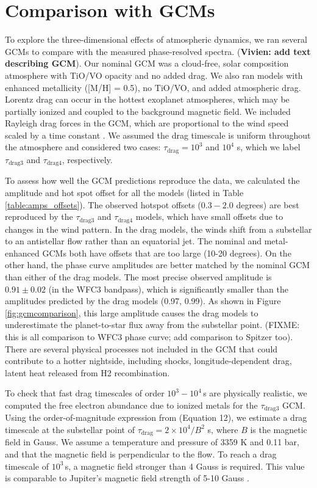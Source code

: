 \documentclass[twocolumn]{aastex61}
\begin{document}
\section{Comparison with GCMs}
\label{sec:gcm}
To explore the three-dimensional effects of atmospheric dynamics, we ran several GCMs to compare with the measured phase-resolved spectra. (\textbf{Vivien: add text describing GCM}).  Our nominal GCM was a cloud-free, solar composition atmosphere with TiO/VO opacity and no added drag.  We also ran models with enhanced metallicity ([M/H] = 0.5), no TiO/VO, and added atmospheric drag.  Lorentz drag can occur in the hottest exoplanet atmospheres, which may be partially ionized and coupled to the background magnetic field. We included Rayleigh drag forces in the GCM, which are proportional to the wind speed scaled by a time constant \citep[$F_\mathrm{drag} \propto -v/\tau_\mathrm{drag}$;][]{menou09}. We assumed the drag timescale is uniform throughout the atmosphere and considered two cases: $\tau_\mathrm{drag} = 10^3$ and $10^4$ s, which we label $\tau_\mathrm{drag3}$ and $\tau_\mathrm{drag4}$, respectively.

To assess how well the GCM predictions reproduce the data, we calculated the amplitude and hot spot offset for all the models (listed in Table\,\ref{table:amps_offsets}). The observed hotspot offsets ($0.3 - 2.0$ degrees) are best reproduced by the $\tau_\mathrm{drag3}$ and $\tau_\mathrm{drag4}$ models, which have small offsets due to changes in the wind pattern. In the drag models, the winds shift from a substellar to an antistellar flow rather than an equatorial jet.  The nominal and metal-enhanced GCMs both have offsets that are too large (10-20 degrees). On the other hand, the phase curve amplitudes are better matched by the nominal GCM than either of the drag models. The most precise observed amplitude is $0.91\pm0.02$ (in the WFC3 bandpass), which is significantly smaller than the amplitudes predicted by the drag models (0.97, 0.99). As shown in Figure\,\ref{fig:gcmcomparison}, this large amplitude causes the drag models to underestimate the planet-to-star flux away from the substellar point. (FIXME: this is all comparison to WFC3 phase curve; add comparison to Spitzer too). There are several physical processes not included in the GCM that could contribute to a hotter nightside, including shocks, longitude-dependent drag, latent heat released from H2 recombination. 

To check that fast drag timescales of order $10^3 - 10^4$\,s are physically realistic, we computed the free electron abundance due to ionized metals for the $\tau_\mathrm{drag3}$ GCM. Using the order-of-magnitude expression from \cite{perna10} (Equation 12), we estimate a drag timescale at the substellar point of $\tau_\mathrm{drag}  = 2\times10^4/B^2$ s, where $B$ is the magnetic field in Gauss. We assume a temperature and pressure of 3359 K and 0.11 bar, and that the magnetic field is perpendicular to the flow. To reach a drag timescale of $10^3$\,s, a magnetic field stronger than 4 Gauss is required. This value is comparable to Jupiter's magnetic field strength of 5-10 Gauss \citep{bagenal04}.
\end{document}
